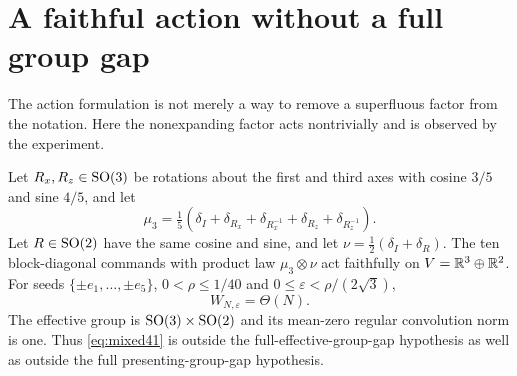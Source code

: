 \section{A faithful action without a full group gap}\label{sec:mixed41}
The action formulation is not merely a way to remove a superfluous
factor from the notation. Here the nonexpanding factor acts nontrivially
and is observed by the experiment.

\begin{proposition}\label{prop:mixed41}
Let $R_x,R_z\in\operatorname{SO}(3)$ be rotations about the first and third axes
with cosine $3/5$ and sine $4/5$, and let
\[
 \mu_3=\tfrac15(\delta_I+\delta_{R_x}+\delta_{R_x^{-1}}
                         +\delta_{R_z}+\delta_{R_z^{-1}}).
\]
Let $R\in\operatorname{SO}(2)$ have the same cosine and sine, and let
$\nu=\tfrac12(\delta_I+\delta_R)$. The ten block-diagonal commands
with product law $\mu_3\otimes\nu$ act faithfully on
$V=\mathbb R^3\oplus\mathbb R^2$. For seeds $\{\pm e_1,\ldots,\pm e_5\}$,
$0<\rho\le1/40$ and $0\le\varepsilon<\rho/(2\sqrt3)$,
\begin{equation}\label{eq:mixed41}
 W_{N,\varepsilon}=\Theta(N).
\end{equation}
The effective group is $\operatorname{SO}(3)\times\operatorname{SO}(2)$ and its mean-zero regular
convolution norm is one. Thus \eqref{eq:mixed41} is outside the
full-effective-group-gap hypothesis as well as outside the full
presenting-group-gap hypothesis.
\end{proposition}

